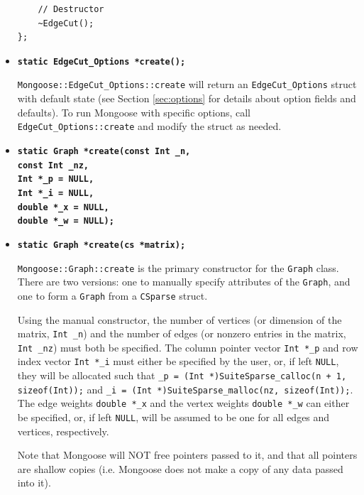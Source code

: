 \documentclass[letter]{article}
\begin{document}
\begin{itemize}
\begin{lstlisting}
    // Destructor
    ~EdgeCut();
};
\end{lstlisting}

\vspace{6pt}
\item \textbf{\texttt{static EdgeCut\_Options *create();}}

\texttt{Mongoose::EdgeCut\_Options::create} will return an \texttt{EdgeCut\_Options} struct with default state (see Section \ref{sec:options} for details about option fields and defaults). To run Mongoose with specific options, call \texttt{EdgeCut\_Options::create} and modify the struct as needed.
\vspace{6pt}
\item \textbf{\texttt{static Graph *create(const Int \_n, \\
\hspace*{4.2cm} const Int \_nz, \\
\hspace*{4.2cm} Int *\_p = NULL, \\
\hspace*{4.2cm} Int *\_i = NULL, \\
\hspace*{4.2cm} double *\_x = NULL, \\
\hspace*{4.2cm} double *\_w = NULL);}}
\item \textbf{\texttt{static Graph *create(cs *matrix);}}

\texttt{Mongoose::Graph::create} is the primary constructor for the \texttt{Graph} class. There are two versions: one to manually specify attributes of the \texttt{Graph}, and one to form a \texttt{Graph} from a \texttt{CSparse} struct.

Using the manual constructor, the number of vertices (or dimension of the matrix, \texttt{Int \_n}) and the number of edges (or nonzero entries in the matrix, \texttt{Int \_nz}) must both be specified. The column pointer vector \texttt{Int *\_p} and row index vector \texttt{Int *\_i} must either be specified by the user, or, if left \texttt{NULL}, they will be allocated such that \texttt{\_p = (Int *)SuiteSparse\_calloc(n + 1, sizeof(Int));} and \texttt{\_i = (Int *)SuiteSparse\_malloc(nz, sizeof(Int));}. The edge weights \texttt{double *\_x} and the vertex weights \texttt{double *\_w} can either be specified, or, if left \texttt{NULL}, will be assumed to be one for all edges and vertices, respectively.

Note that Mongoose will NOT free pointers passed to it, and that all pointers are shallow copies (i.e. Mongoose does not make a copy of any data passed into it).


\end{itemize}
\end{document}
